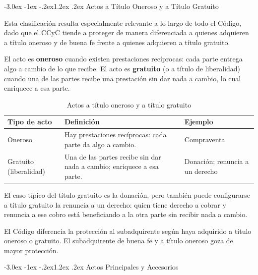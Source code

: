 \documentclass[12pt,oneside]{book}
\makeatletter
\renewcommand\section{\@startsection{section}{1}{\z@}%
  {-3.0ex \@plus -1ex \@minus -.2ex}{1.2ex \@plus .2ex}%
  {\normalfont\large\bfseries\color{acento}}}
\makeatother
\begin{document}
\section{Actos a Título Oneroso y a Título Gratuito}

Esta clasificación resulta especialmente relevante a lo largo de todo el Código, dado que el CCyC tiende a proteger de manera diferenciada a quienes adquieren a título oneroso y de buena fe frente a quienes adquieren a título gratuito.

\begin{definicion}
El acto es \textbf{oneroso} cuando existen prestaciones recíprocas: cada parte entrega algo a cambio de lo que recibe. El acto es \textbf{gratuito} (o a título de liberalidad) cuando una de las partes recibe una prestación sin dar nada a cambio, lo cual enriquece a esa parte.
\end{definicion}

\begin{table}[H]
\centering
\begin{tabularx}{\textwidth}{l X X}
\toprule
\textbf{Tipo de acto} & \textbf{Definición} & \textbf{Ejemplo} \\
\midrule
Oneroso & Hay prestaciones recíprocas: cada parte da algo a cambio. & Compraventa \\
Gratuito (liberalidad) & Una de las partes recibe sin dar nada a cambio; enriquece a esa parte. & Donación; renuncia a un derecho \\
\bottomrule
\end{tabularx}
\caption{Actos a título oneroso y a título gratuito}
\end{table}

El caso típico del título gratuito es la donación, pero también puede configurarse a título gratuito la renuncia a un derecho: quien tiene derecho a cobrar y renuncia a ese cobro está beneficiando a la otra parte sin recibir nada a cambio.

\begin{regla}
El Código diferencia la protección al subadquirente según haya adquirido a título oneroso o gratuito. El subadquirente de buena fe y a título oneroso goza de mayor protección.
\end{regla}

\section{Actos Principales y Accesorios}
\end{document}
